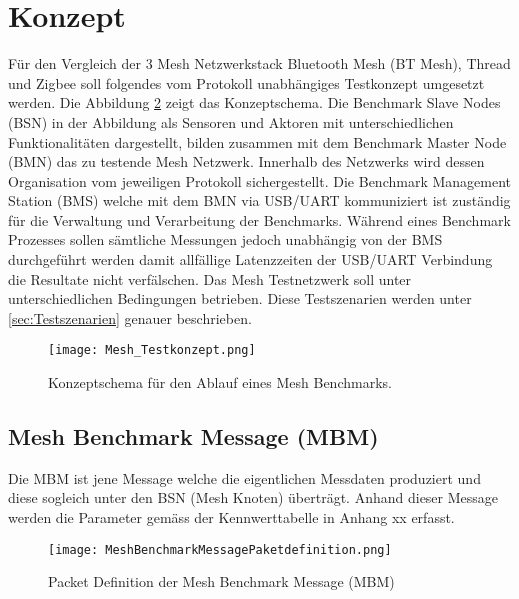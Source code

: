 	\clearpage
\section{Konzept}\label{sec:Konzept}

Für den Vergleich der 3 Mesh Netzwerkstack Bluetooth Mesh (BT Mesh), Thread und Zigbee soll folgendes vom Protokoll unabhängiges Testkonzept umgesetzt werden. 
Die Abbildung \ref{fig:MeshTestKonzept} zeigt das Konzeptschema. Die Benchmark Slave Nodes (BSN) in der Abbildung als Sensoren und Aktoren mit unterschiedlichen Funktionalitäten dargestellt, bilden zusammen mit dem Benchmark Master Node (BMN) das zu testende Mesh Netzwerk. Innerhalb des Netzwerks wird dessen Organisation vom jeweiligen Protokoll sichergestellt. 
Die Benchmark Management Station (BMS) welche mit dem BMN via USB/UART kommuniziert ist zuständig für die Verwaltung und Verarbeitung der Benchmarks. Während eines Benchmark Prozesses sollen sämtliche Messungen jedoch unabhängig von der BMS durchgeführt werden damit allfällige Latenzzeiten der USB/UART Verbindung die Resultate nicht verfälschen.
Das Mesh Testnetzwerk soll unter unterschiedlichen Bedingungen betrieben. Diese Testszenarien werden unter \ref{sec:Testszenarien} genauer beschrieben.




\begin{figure}[H]
	\centering
	\texttt{[image: Mesh\_Testkonzept.png]}
	\caption{Konzeptschema für den Ablauf eines Mesh Benchmarks.}\label{fig:MeshTestKonzept}
\end{figure}



\subsection{Mesh Benchmark Message (MBM)}\label{subsec:MeshBenchmarkMessage}
Die MBM ist jene Message welche die eigentlichen Messdaten produziert und diese sogleich unter den BSN (Mesh Knoten) überträgt. Anhand dieser Message werden die Parameter gemäss der Kennwerttabelle in Anhang xx erfasst.


\begin{figure}[H]
	\centering
	\texttt{[image: MeshBenchmarkMessagePaketdefinition.png]}
	\caption{Packet Definition der Mesh Benchmark Message (MBM)}\label{fig:MeshTestKonzept}
\end{figure}



